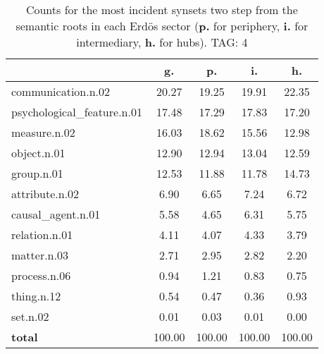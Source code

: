 \begin{table}[h!]
\begin{center}
\begin{tabular}{| l | c | c | c | c |}\hline
 & g. & p. & i. & h. \\\hline
communication.n.02 & 20.27  & 19.25  & 19.91  & 22.35 \\\hline
psychological\_feature.n.01 & 17.48  & 17.29  & 17.83  & 17.20 \\\hline
measure.n.02 & 16.03  & 18.62  & 15.56  & 12.98 \\\hline
object.n.01 & 12.90  & 12.94  & 13.04  & 12.59 \\\hline
group.n.01 & 12.53  & 11.88  & 11.78  & 14.73 \\\hline
attribute.n.02 & 6.90  & 6.65  & 7.24  & 6.72 \\\hline
causal\_agent.n.01 & 5.58  & 4.65  & 6.31  & 5.75 \\\hline
relation.n.01 & 4.11  & 4.07  & 4.33  & 3.79 \\\hline
matter.n.03 & 2.71  & 2.95  & 2.82  & 2.20 \\\hline
process.n.06 & 0.94  & 1.21  & 0.83  & 0.75 \\\hline
thing.n.12 & 0.54  & 0.47  & 0.36  & 0.93 \\\hline
set.n.02 & 0.01  & 0.03  & 0.01  & 0.00 \\\hline
{{\bf total}} & 100.00  & 100.00  & 100.00  & 100.00 \\\hline
\end{tabular}
\caption{Counts for the most incident synsets two step from the semantic roots in each Erd\"os sector ({\bf p.} for periphery, {\bf i.} for intermediary, {\bf h.} for hubs). TAG: 4}
\end{center}
\end{table}